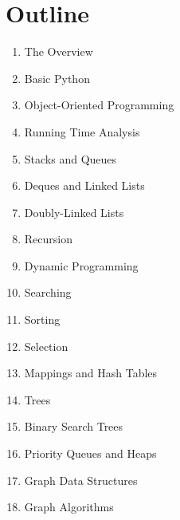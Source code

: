 \chapter{Outline}

\begin{enumerate}

\item The Overview

\item Basic Python

\item Object-Oriented Programming

\item Running Time Analysis

\item Stacks and Queues

\item Deques and Linked Lists

\item Doubly-Linked Lists

\item Recursion

\item Dynamic Programming

\item Searching

\item Sorting

\item Selection

\item Mappings and Hash Tables

\item Trees

\item Binary Search Trees

\item Priority Queues and Heaps

\item Graph Data Structures

\item Graph Algorithms

\end{enumerate}